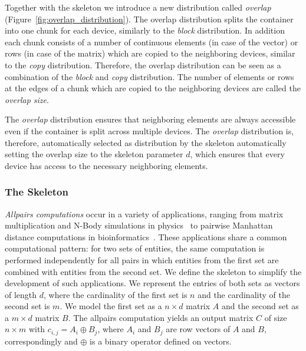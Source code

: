 Together with the \stencil skeleton we introduce a new distribution called \emph{overlap} (Figure~\ref{fig:overlap_distribution}).
The overlap distribution splits the container into one chunk for each device, similarly to the \emph{block} distribution.
In addition each chunk consists of a number of continuous elements (in case of the vector) or rows (in case of the matrix) which are copied to the neighboring devices, similar to the \emph{copy} distribution.
Therefore, the overlap distribution can be seen as a combination of the \emph{block} and \emph{copy} distribution.
The number of elements or rows at the edges of a chunk which are copied to the neighboring devices are called the \emph{overlap size}.

The \emph{overlap} distribution ensures that neighboring elements are always accessible even if the container is split across multiple devices.
The \emph{overlap} distribution is, therefore, automatically selected as distribution by the \stencil skeleton automatically setting the overlap size to the skeleton parameter $d$, which ensures that every device has access to the necessary neighboring elements.





\subsubsection{The \allpairs Skeleton}
\label{sec:allpairs_skeleton}

\emph{Allpairs computations} occur in a variety of applications, ranging from matrix multiplication and N-Body simulations in physics~\cite{AroraShVu2009} to pairwise Manhattan distance computations in bioinformatics~\cite{ChangDeQuRo2009}.
These applications share a common computational pattern:
for two sets of entities, the same computation is performed independently for all pairs in which entities from the first set are combined with entities from the second set.
We define the \allpairs skeleton to simplify the development of such applications.
We represent the entries of both sets as vectors of length $d$, where the cardinality of the first set is $n$ and the cardinality of the second set is $m$.
We model the first set as a $n\times d$ matrix $A$ and the second set as a $m\times d$ matrix $B$.
The allpairs computation yields an output matrix $C$ of size $n\times m$ with $c_{i, j} = A_i \oplus B_j$, where $A_i$ and $B_j$ are row vectors of $A$ and $B$, correspondingly
and $\oplus$ is a binary operator defined on vectors.

